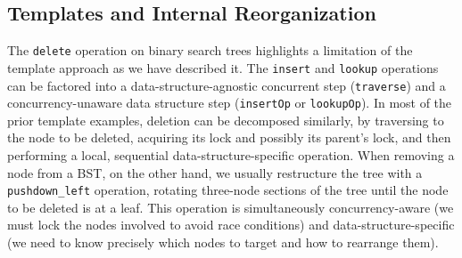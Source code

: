 \documentclass[sigplan,10pt, screen]{acmart}
\newcommand{\treerep}{\ensuremath{\mathsf{Abs}}}
\begin{document}



\subsection{Templates and Internal Reorganization}
\label{internal_reorganize}
The \lstinline{delete} operation on binary search trees highlights a limitation of the template approach as we have described it. The \lstinline{insert} and \lstinline{lookup} operations can be factored into a data-structure-agnostic concurrent step (\lstinline{traverse}) and a concurrency-unaware data structure step (\lstinline{insertOp} or \lstinline{lookupOp}). In most of the prior template examples, deletion can be decomposed similarly, by traversing to the node to be deleted, acquiring its lock and possibly its parent's lock, and then performing a local, sequential data-structure-specific operation. When removing a node from a BST, on the other hand, we usually restructure the tree with a \lstinline{pushdown_left} operation, %
rotating three-node sections of the tree until the node to be deleted is at a leaf. This operation is simultaneously concurrency-aware (we must lock the nodes involved to avoid race conditions) and data-structure-specific (we need to know precisely which nodes to target and how to rearrange them).
\end{document}
